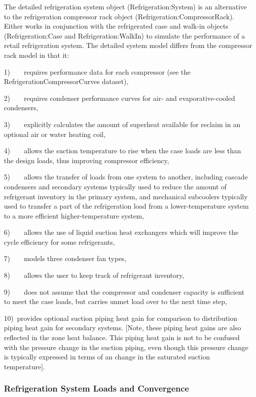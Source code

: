 The detailed refrigeration system object (Refrigeration:System) is an alternative to the refrigeration compressor rack object (Refrigeration:CompressorRack). Either works in conjunction with the refrigerated case and walk-in objects (Refrigeration:Case and Refrigeration:WalkIn) to simulate the performance of a retail refrigeration system. The detailed system model differs from the compressor rack model in that it:

1)~~~~requires performance data for each compressor (see the RefrigerationCompressorCurves dataset),

2)~~~~requires condenser performance curves for air- and evaporative-cooled condensers,

3)~~~~explicitly calculates the amount of superheat available for reclaim in an optional air or water heating coil,

4)~~~~allows the suction temperature to rise when the case loads are less than the design loads, thus improving compressor efficiency,

5)~~~~allows the transfer of loads from one system to another, including cascade condensers and secondary systems typically used to reduce the amount of refrigerant inventory in the primary system, and mechanical subcoolers typically used to transfer a part of the refrigeration load from a lower-temperature system to a more efficient higher-temperature system,

6)~~~~allows the use of liquid suction heat exchangers which will improve the cycle efficiency for some refrigerants,

7)~~~~models three condenser fan types,

8)~~~~allows the user to keep track of refrigerant inventory,

9)~~~~does not assume that the compressor and condenser capacity is sufficient to meet the case loads, but carries unmet load over to the next time step,

10)~provides optional suction piping heat gain for comparison to distribution piping heat gain for secondary systems. {[}Note, these piping heat gains are also reflected in the zone heat balance. This piping heat gain is not to be confused with the pressure change in the suction piping, even though this pressure change is typically expressed in terms of an change in the saturated suction temperature{]}.

\subsubsection{Refrigeration System Loads and Convergence}\label{refrigeration-system-loads-and-convergence}

